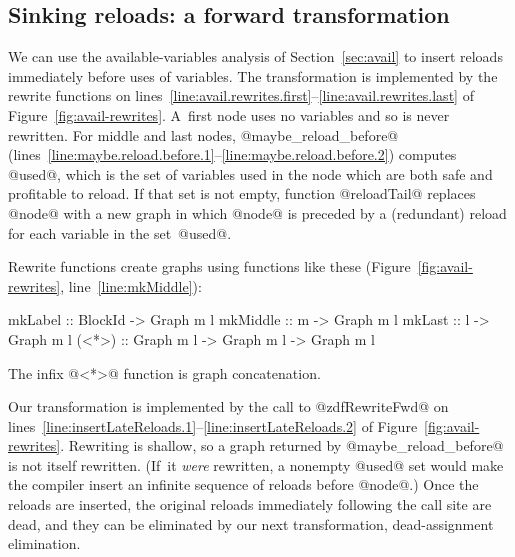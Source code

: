 \documentclass[blockstyle,preprint,natbib,nocopyrightspace]{sigplanconf}
\newcommand\lineref[1]{line~\ref{line:#1}}
\newcommand\linerangeref[2]{\mbox{lines~\ref{line:#1}--\ref{line:#2}}}
\newcommand{\authornote}[1]{{\em #1}}
\def\authornote#1{\unskip\relax}
\newcommand{\simon}[1]{\authornote{SLPJ: #1}}
\def\finalremark#1{\relax}
\newcommand\secref[1]{Section~\ref{sec:#1}}
\newcommand\seclabel[1]{\label{sec:#1}}
\newcommand\figref[1]{Figure~\ref{fig:#1}}
\begin{document}
\subsection{Sinking reloads: a forward transformation}

\finalremark{Incidentally, I wonder if we should
use record notation when constructing @ForwardRewrites@?}

\seclabel{sink-reloads}

We can use the available-variables analysis of \secref{avail} to
insert reloads
immediately before uses of variables.
The transformation is implemented by the rewrite functions on
\linerangeref{avail.rewrites.first}{avail.rewrites.last} of \figref{avail-rewrites}.
A~first node uses no variables and so is never rewritten.
For middle and last nodes, @maybe_reload_before@ 
(\linerangeref{maybe.reload.before.1}{maybe.reload.before.2})
computes @used@, which is the set
of variables used in the node which are both safe and profitable to
reload. 
If that set is not empty, function
@reloadTail@ replaces @node@ with a new graph in which @node@ is
preceded by a (redundant) reload for each variable in the set~@used@.

Rewrite functions create graphs using functions like these
(\figref{avail-rewrites}, \lineref{mkMiddle}):
\begin{code}
mkLabel  :: BlockId -> Graph m l
mkMiddle :: m       -> Graph m l
mkLast   :: l       -> Graph m l
(<*>)    :: Graph m l -> Graph m l -> Graph m l
\end{code}
The infix @<*>@ function is graph concatenation.

Our transformation is implemented by the call to @zdfRewriteFwd@
on \linerangeref{insertLateReloads.1}{insertLateReloads.2} of \figref{avail-rewrites}.
Rewriting is shallow, so a graph returned by
@maybe_reload_before@ is not itself rewritten.
(If~it \emph{were} rewritten, a nonempty @used@ set would make the
compiler insert an infinite sequence of reloads before @node@.)
Once the reloads are inserted, the original reloads immediately
following the call site are dead, and they can be eliminated by our
next transformation, dead-assignment elimination.
\end{document}
